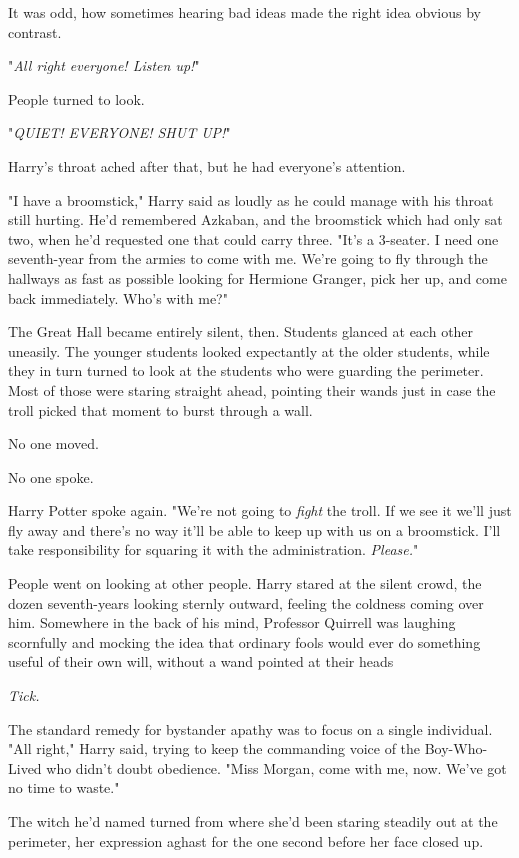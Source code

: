 It was odd, how sometimes hearing bad ideas made the right idea obvious by
contrast.

"\emph{All right everyone! Listen up!}"

People turned to look.

"\emph{QUIET! EVERYONE! SHUT UP!}"

Harry's throat ached after that, but he had everyone's attention.

"I have a broomstick," Harry said as loudly as he could manage with his throat
still hurting. He'd remembered Azkaban, and the broomstick which had only sat
two, when he'd requested one that could carry three. "It's a 3-seater. I need
one seventh-year from the armies to come with me. We're going to fly through
the hallways as fast as possible looking for Hermione Granger, pick her up, and
come back immediately. Who's with me?"

The Great Hall became entirely silent, then.
\sbreak
Students glanced at each other uneasily. The younger students looked
expectantly at the older students, while they in turn turned to look at the
students who were guarding the perimeter. Most of those were staring straight
ahead, pointing their wands just in case the troll picked that moment to burst
through a wall.

No one moved.

No one spoke.

Harry Potter spoke again. "We're not going to \emph{fight} the troll. If we see
it we'll just fly away and there's no way it'll be able to keep up with us on a
broomstick. I'll take responsibility for squaring it with the administration.
\emph{Please.}"

People went on looking at other people.
\sbreak
Harry stared at the silent crowd, the dozen seventh-years looking sternly
outward, feeling the coldness coming over him. Somewhere in the back of his
mind, Professor Quirrell was laughing scornfully and mocking the idea that
ordinary fools would ever do something useful of their own will, without a wand
pointed at their heads{\el}

\emph{Tick.}

The standard remedy for bystander apathy was to focus on a single individual.
"All right," Harry said, trying to keep the commanding voice of the
Boy-Who-Lived who didn't doubt obedience. "Miss Morgan, come with me, now.
We've got no time to waste."

The witch he'd named turned from where she'd been staring steadily out at the
perimeter, her expression aghast for the one second before her face closed up.

